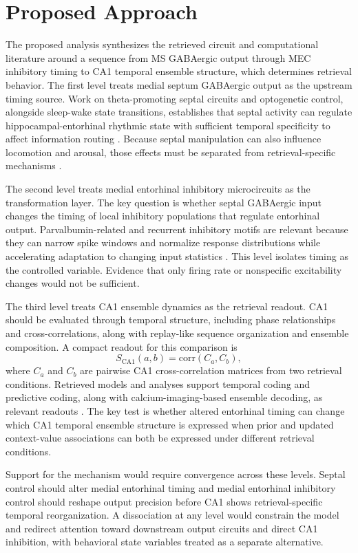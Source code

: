 \section{Proposed Approach}

The proposed analysis synthesizes the retrieved circuit and computational literature around a sequence from MS GABAergic output through MEC inhibitory timing to CA1 temporal ensemble structure, which determines retrieval behavior. The first level treats medial septum GABAergic output as the upstream timing source. Work on theta-promoting septal circuits and optogenetic control, alongside sleep-wake state transitions, establishes that septal activity can regulate hippocampal-entorhinal rhythmic state with sufficient temporal specificity to affect information routing \cite{arxiv151001100,arxiv221113591,arxiv250904454}. Because septal manipulation can also influence locomotion and arousal, those effects must be separated from retrieval-specific mechanisms \cite{arxiv181200625,arxiv210812261}.

The second level treats medial entorhinal inhibitory microcircuits as the transformation layer. The key question is whether septal GABAergic input changes the timing of local inhibitory populations that regulate entorhinal output. Parvalbumin-related and recurrent inhibitory motifs are relevant because they can narrow spike windows and normalize response distributions while accelerating adaptation to changing input statistics \cite{arxiv160903622,arxiv220910634,arxiv240517745}. This level isolates timing as the controlled variable. Evidence that only firing rate or nonspecific excitability changes would not be sufficient.

The third level treats CA1 ensemble dynamics as the retrieval readout. CA1 should be evaluated through temporal structure, including phase relationships and cross-correlations, along with replay-like sequence organization and ensemble composition. A compact readout for this comparison is
\[
S_{\mathrm{CA1}}(a,b)=\mathrm{corr}(C_a,C_b),
\]
where \(C_a\) and \(C_b\) are pairwise CA1 cross-correlation matrices from two retrieval conditions. Retrieved models and analyses support temporal coding and predictive coding, along with calcium-imaging-based ensemble decoding, as relevant readouts \cite{arxiv191211126,arxiv230511982,arxiv250809576}. The key test is whether altered entorhinal timing can change which CA1 temporal ensemble structure is expressed when prior and updated context-value associations can both be expressed under different retrieval conditions.

Support for the mechanism would require convergence across these levels. Septal control should alter medial entorhinal timing and medial entorhinal inhibitory control should reshape output precision before CA1 shows retrieval-specific temporal reorganization. A dissociation at any level would constrain the model and redirect attention toward downstream output circuits and direct CA1 inhibition, with behavioral state variables treated as a separate alternative.
